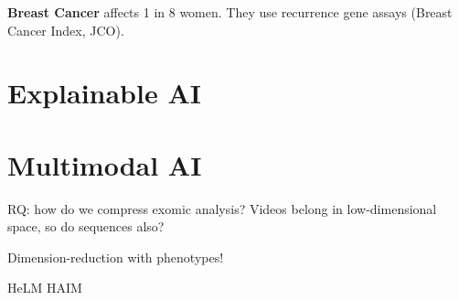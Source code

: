 \textbf{Breast Cancer} affects 1 in 8 women. They use recurrence gene assays (Breast Cancer Index, JCO). 



\section{Explainable AI}

\section{Multimodal AI}

RQ: how do we compress exomic analysis? 
Videos belong in low-dimensional space, so do sequences also?

Dimension-reduction with phenotypes! 

HeLM
HAIM 